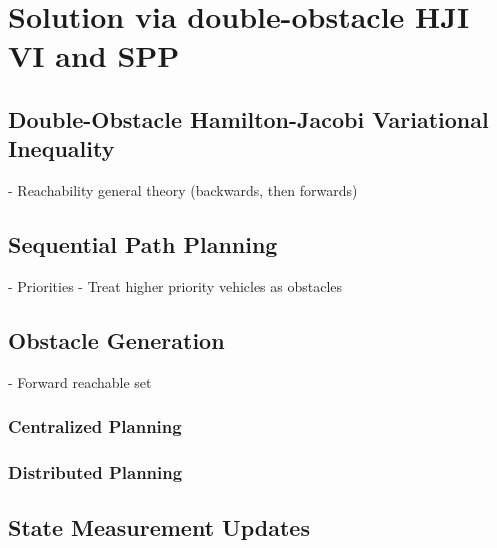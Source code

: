 \section{Solution via double-obstacle HJI VI and SPP\label{sec:solution}}
\subsection{Double-Obstacle Hamilton-Jacobi Variational Inequality}
- Reachability general theory (backwards, then forwards)
\subsection{Sequential Path Planning}
- Priorities
- Treat higher priority vehicles as obstacles
\subsection{Obstacle Generation}
- Forward reachable set
\subsubsection{Centralized Planning}
\subsubsection{Distributed Planning}

\subsection{State Measurement Updates}